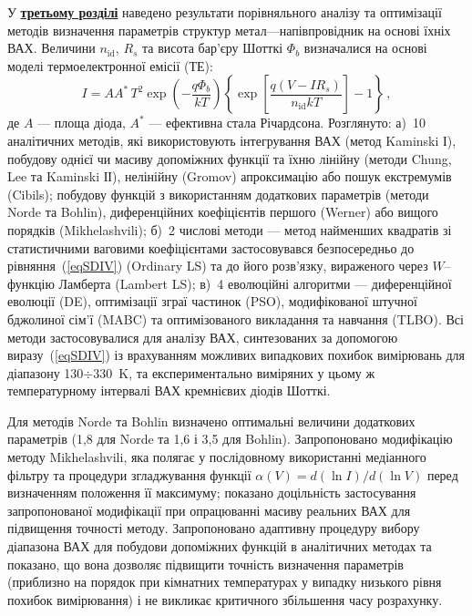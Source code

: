 У  \underline{\textbf{третьому розділі}} наведено результати порівняльного аналізу та оптимізації методів
визначення параметрів структур
метал---напівпровідник на основі їхніх ВАХ.
Величини $n_\mathrm{id}$, $R_s$ та висота бар'єру Шотткі $\Phi_b$ визначалися на основі
моделі термоелектронної емісії (ТЕ):
\begin{equation}\label{eqSDIV}
I=AA^*\,T^2\exp\left(-\frac{q\Phi_b}{kT}\right)\left\{\exp\left[\frac{q(V-IR_s)}{n_\mathrm{id}kT}\right]-1\right\}\,,
\end{equation}
де
$A$ --- площа діода,
$A^*$ --- ефективна стала Річардсона.
Розглянуто:
а)~10 аналітичних методів, які використовують інтегрування ВАХ (метод Kaminski І),
побудову однієї чи масиву допоміжних функції та їхню лінійну (методи Chung, Lee та Kaminski ІІ),
нелінійну (Gromov) апроксимацію або пошук екстремумів (Cibils);
побудову функцій з використанням додаткових параметрів (методи Norde та Bohlin),
диференційних коефіцієнтів першого (Werner) або вищого порядків (Mikhelashvili);
б)~2 числові методи --- метод найменших квадратів зі статистичними ваговими коефіцієнтами
застосовувався безпосередньо до рівняння~(\ref{eqSDIV}) (Ordinary LS) та до
його розв'язку, вираженого через $W$--функцію Ламберта (Lambert LS);
в)~4 еволюційні алгоритми --- диференційної еволюції (DE),
оптимізації зграї частинок (PSO),
модифікованої штучної бджолиної сім'ї (MABC) та
оптимізованого викладання та навчання (TLBO).
Всі методи застосовувалися для аналізу
ВАХ,  синтезованих за допомогою виразу~(\ref{eqSDIV}) із врахуванням можливих випадкових похибок вимірювань
для діапазону 130$\div$330~K,
та експериментально виміряних у цьому ж температурному інтервалі ВАХ кремнієвих діодів Шотткі.

Для методів Norde та Bohlin визначено  оптимальні величини додаткових параметрів (1,8 для Norde та 1,6 і 3,5 для Bohlin).
Запропоновано модифікацію методу Mikhelashvili, яка
полягає у послідовному використанні медіанного фільтру та процедури згладжування функції $\alpha(V)=d(\ln I)/d(\ln V)$
перед визначенням положення її максимуму;
показано доцільність застосування запропонованої модифікації при опрацюванні масиву реальних ВАХ для
підвищення точності методу.
Запропоновано адаптивну процедуру вибору діапазона ВАХ для побудови допоміжних функцій в
аналітичних методах та показано, що вона дозволяє підвищити точність визначення параметрів
(приблизно на порядок при кімнатних температурах у випадку низького рівня похибок вимірювання)
і не викликає критичного збільшення часу розрахунку.



